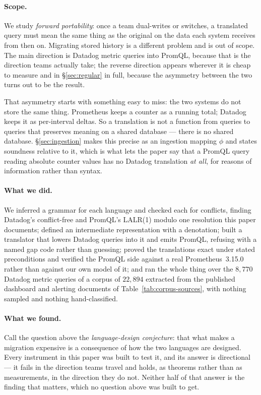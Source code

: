 \paragraph{Scope.}
We study \emph{forward portability}: once a team dual-writes or switches, a translated
query must mean the same thing as the original on the data each system receives from then
on. Migrating stored history is a different problem and is out of scope. The main
direction is Datadog metric queries into PromQL, because that is the direction teams
actually take; the reverse direction appears wherever it is cheap to measure and in
\S\ref{sec:regular} in full, because the asymmetry between the two turns out to be the
result.

That asymmetry starts with something easy to miss: the two systems do not store the same
thing. Prometheus keeps a counter as a running total; Datadog keeps it as per-interval
deltas. So a translation is not a function from queries to queries that preserves
meaning on a shared database --- there is no shared database. \S\ref{sec:ingestion}
makes this precise as an ingestion mapping $\phi$ and states soundness relative to it,
which is what lets the paper say that a PromQL query reading absolute counter values has
no Datadog translation \emph{at all}, for reasons of information rather than syntax.

\paragraph{What we did.}
We inferred a grammar for each language and checked each for conflicts, finding
Datadog's conflict-free and PromQL's LALR(1) modulo one resolution this paper documents; defined an
intermediate representation with a denotation; built a translator that lowers Datadog
queries into it and emits PromQL, refusing with a named gap code rather than guessing;
proved the translations exact under stated preconditions and verified the PromQL side
against a real Prometheus~3.15.0 rather than against our own model of it; and ran the
whole thing over the $8{,}770$ Datadog metric queries of a corpus of $22{,}894$
extracted from the published dashboard and alerting documents of
Table~\ref{tab:corpus-sources}, with nothing sampled
and nothing hand-classified.

\paragraph{What we found.}
Call the question above the \emph{language-design conjecture}: that what makes a
migration expensive is a consequence of how the two languages are designed. Every
instrument in this paper was built to test it, and its answer is directional --- it
fails in the direction teams travel and holds, as theorems rather than as measurements,
in the direction they do not. Neither half of that answer is the finding that matters,
which no question above was built to get.

